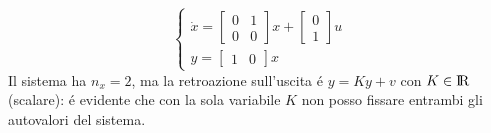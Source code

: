 \documentclass[../main.tex]{subfiles}
\begin{document}
		\begin{Exercise}[title={Retroazione algebrica sull'uscita}, difficulty=1]
			\[
				\begin{cases}
					\dot x=
					\begin{bmatrix}
						0 & 1\\
						0 & 0
					\end{bmatrix} x+
					\begin{bmatrix}
						0\\
						1
					\end{bmatrix} u
					\\[.5cm]
					y =
					\begin{bmatrix}
						1 & 0
					\end{bmatrix} x
				\end{cases}
			\]
			Il sistema ha $ n_x = 2 $, ma la retroazione sull'uscita \'e $ y = Ky + v $ con $ K \in \rm I\!R $ (scalare): \'e evidente che con la sola variabile $ K $ non posso fissare entrambi gli autovalori del sistema.
			

\end{Exercise}
\end{document}
